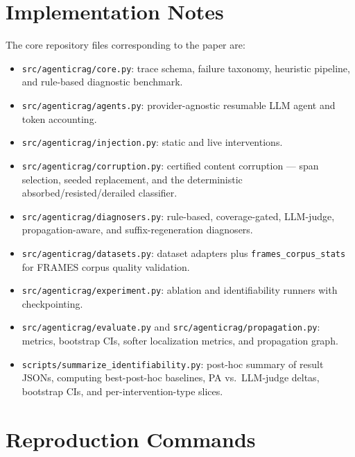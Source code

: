 \documentclass[11pt]{article}
\begin{document}
\appendix

\section{Implementation Notes}
\label{app:impl}

The core repository files corresponding to the paper are:
\begin{itemize}[leftmargin=*]
  \item \texttt{src/agenticrag/core.py}: trace schema, failure taxonomy,
  heuristic pipeline, and rule-based diagnostic benchmark.
  \item \texttt{src/agenticrag/agents.py}: provider-agnostic resumable LLM
  agent and token accounting.
  \item \texttt{src/agenticrag/injection.py}: static and live interventions.
  \item \texttt{src/agenticrag/corruption.py}: certified content corruption ---
  span selection, seeded replacement, and the deterministic
  absorbed/resisted/derailed classifier.
  \item \texttt{src/agenticrag/diagnosers.py}: rule-based, coverage-gated,
  LLM-judge, propagation-aware, and suffix-regeneration diagnosers.
  \item \texttt{src/agenticrag/datasets.py}: dataset adapters plus
  \texttt{frames\_corpus\_stats} for FRAMES corpus quality validation.
  \item \texttt{src/agenticrag/experiment.py}: ablation and identifiability
  runners with checkpointing.
  \item \texttt{src/agenticrag/evaluate.py} and
  \texttt{src/agenticrag/propagation.py}: metrics, bootstrap CIs, softer
  localization metrics, and propagation graph.
  \item \texttt{scripts/summarize\_identifiability.py}: post-hoc summary of
  result JSONs, computing best-post-hoc baselines, PA vs.\ LLM-judge deltas,
  bootstrap CIs, and per-intervention-type slices.
\end{itemize}

\section{Reproduction Commands}
\label{app:repro}
\end{document}
